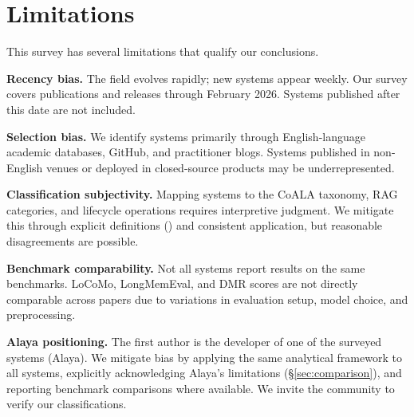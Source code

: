 \section{Limitations}
\label{sec:limitations}

This survey has several limitations that qualify our conclusions.

\textbf{Recency bias.} The field evolves rapidly; new systems appear
weekly. Our survey covers publications and releases through February
2026. Systems published after this date are not included.

\textbf{Selection bias.} We identify systems primarily through
English-language academic databases, GitHub, and practitioner blogs.
Systems published in non-English venues or deployed in closed-source
products may be underrepresented.

\textbf{Classification subjectivity.} Mapping systems to the CoALA
taxonomy, RAG categories, and lifecycle operations requires
interpretive judgment. We mitigate this through explicit definitions
() and consistent application, but reasonable
disagreements are possible.

\textbf{Benchmark comparability.} Not all systems report results on
the same benchmarks. LoCoMo, LongMemEval, and DMR scores are not
directly comparable across papers due to variations in evaluation
setup, model choice, and preprocessing.

\textbf{Alaya positioning.} The first author is the developer of one
of the surveyed systems (Alaya). We mitigate bias by applying the
same analytical framework to all systems, explicitly acknowledging
Alaya's limitations (\S\ref{sec:comparison}), and reporting
benchmark comparisons where available. We invite the community to
verify our classifications.
